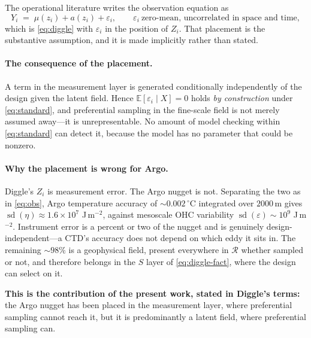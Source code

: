 \documentclass[11pt]{article}
\begin{document}
The operational literature writes the observation equation as
\begin{equation}
  \label{eq:standard}
  Y_i \;=\; \mu(z_i) + a(z_i) + \varepsilon_i,
  \qquad \varepsilon_i \ \text{zero-mean, uncorrelated in space and time},
\end{equation}
which is \eqref{eq:diggle} with $\varepsilon_i$ in the position of $Z_i$. That placement is the
substantive assumption, and it is made implicitly rather than stated.

\paragraph{The consequence of the placement.} A term in the measurement layer is generated
conditionally independently of the design given the latent field. Hence
$\mathbb{E}[\varepsilon_i \mid X] = 0$ holds \emph{by construction} under \eqref{eq:standard},
and preferential sampling in the fine-scale field is not merely assumed away---it is
unrepresentable. No amount of model checking within \eqref{eq:standard} can detect it, because
the model has no parameter that could be nonzero.

\paragraph{Why the placement is wrong for Argo.} Diggle's $Z_i$ is measurement error. The Argo
nugget is not. Separating the two as in \eqref{eq:obs}, Argo temperature accuracy of
$\sim0.002\,^\circ$C integrated over $2000$\,m gives
$\operatorname{sd}(\eta) \approx 1.6\times10^{7}$ J\,m$^{-2}$, against mesoscale OHC
variability $\operatorname{sd}(\varepsilon) \sim 10^{9}$ J\,m$^{-2}$. Instrument error is a
percent or two of the nugget and is genuinely design-independent---a CTD's accuracy does not
depend on which eddy it sits in. The remaining $\sim\!98\%$ is a geophysical field, present
everywhere in $\mathcal{R}$ whether sampled or not, and therefore belongs in the $S$ layer of
\eqref{eq:diggle-fact}, where the design can select on it.

\medskip
\noindent
\textbf{This is the contribution of the present work, stated in Diggle's terms:} the Argo
nugget has been placed in the measurement layer, where preferential sampling cannot reach it,
but it is predominantly a latent field, where preferential sampling can.
\end{document}
